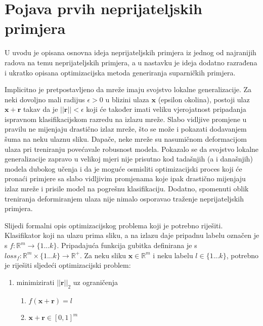 \documentclass[utf8, diplomski]{fer}
\begin{document}
\section{Pojava prvih neprijateljskih primjera}
U uvodu je opisana osnovna ideja neprijateljskih primjera iz jednog od najranijih radova na temu neprijateljskih primjera\citep{Szegedy2014IntriguingPO}, a u nastavku je ideja dodatno razrađena i ukratko opisana optimizacijska metoda generiranja suparničkih primjera.
\par
Implicitno je pretpostavljeno da mreže imaju svojstvo lokalne generalizacije. Za neki dovoljno mali radijus $\epsilon > 0$ u blizini ulaza $\boldsymbol{x}$ (epsilon okolina), postoji ulaz $\boldsymbol{x} + \boldsymbol{r}$ takav da je $||\boldsymbol{r}|| < \epsilon$ koji će također imati veliku vjerojatnost pripadanja ispravnom klasifikacijskom razredu na izlazu mreže. Slabo vidljive promjene u pravilu ne mijenjaju drastično izlaz mreže, što se može i pokazati dodavanjem šuma na neku ulaznu sliku. Dapače, neke mreže su nasumičnom deformacijom ulaza pri treniranju povećavale robusnost modela. Pokazalo se da svojstvo lokalne generalizacije zapravo u velikoj mjeri nije prisutno kod tadašnjih (a i današnjih) modela dubokog učenja i da je moguće osmisliti optimizacijski proces koji će pronaći primjere sa slabo vidljivim promjenama koje ipak drastično mijenjaju izlaz mreže i prisile model na pogrešnu klasifikaciju. Dodatno, spomenuti oblik treniranja deformiranjem ulaza nije nimalo osporavao traženje neprijateljskih primjera.
\par
Slijedi formalni opis optimizacijskog problema koji je potrebno riješiti. \\
Klasifikator koji na ulazu prima sliku, a na izlazu daje pripadnu labelu označen je s $f : \mathbb{R}^{m} \rightarrow \{1...k\}$. Pripadajuća funkcija gubitka definirana je s $loss_{f} : \mathbb{R}^{m}\times\{1...k\} \rightarrow \mathbb{R}^{+}$. Za neku sliku $\boldsymbol{x} \in \mathbb{R}^{m}$ i neku labelu $l \in \{1...k\}$, potrebno je riješiti sljedeći optimizacijski problem:
\begin{enumerate}[noitemsep, label=\textbullet]\label{original_formulation}
  \item minimizirati $||\boldsymbol{r}||_{2}$ uz ograničenja
  \begin{enumerate}
  \item $f(\boldsymbol{x}+\boldsymbol{r}) = l$
  \item $\boldsymbol{x} + \boldsymbol{r} \in [0, 1]^{m}$
  \end{enumerate}
\end{enumerate}
\end{document}
